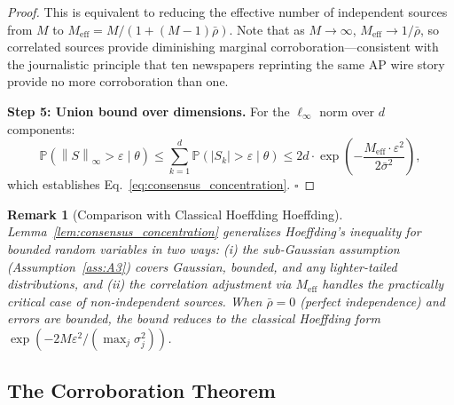 \documentclass[11pt,a4paper]{article}
\newtheorem{remark}[theorem]{Remark}
\theoremstyle{definition}
\newcommand{\Pbb}{\mathbb{P}}
\newcommand{\norm}[1]{\left\lVert#1\right\rVert}
\newcommand{\abs}[1]{\left|#1\right|}
\begin{document}
\begin{proof}
This is equivalent to reducing the effective number of independent sources from $M$ to $M_{\mathrm{eff}} = M / (1 + (M-1)\bar{\rho})$. Note that as $M \to \infty$, $M_{\mathrm{eff}} \to 1/\bar{\rho}$, so correlated sources provide diminishing marginal corroboration---consistent with the journalistic principle that ten newspapers reprinting the same AP wire story provide no more corroboration than one.

\textbf{Step 5: Union bound over dimensions.} For the $\ell_\infty$ norm over $d$ components:
\begin{equation}
    \Pbb(\norm{S}_\infty > \varepsilon \mid \theta) \leq \sum_{k=1}^{d} \Pbb(\abs{S_k} > \varepsilon \mid \theta) \leq 2d \cdot \exp\left(-\frac{M_{\mathrm{eff}} \cdot \varepsilon^2}{2\bar{\sigma}^2}\right),
    \label{eq:union_bound}
\end{equation}
which establishes Eq.~\eqref{eq:consensus_concentration}. $\square$
\end{proof}

\begin{remark}[Comparison with Classical Hoeffding Hoeffding]
Lemma~\ref{lem:consensus_concentration} generalizes Hoeffding's inequality for bounded random variables in two ways: (i) the sub-Gaussian assumption (Assumption~\ref{ass:A3}) covers Gaussian, bounded, and any lighter-tailed distributions, and (ii) the correlation adjustment via $M_{\mathrm{eff}}$ handles the practically critical case of non-independent sources. When $\bar{\rho} = 0$ (perfect independence) and errors are bounded, the bound reduces to the classical Hoeffding form $\exp(-2M\varepsilon^2 / (\max_j \sigma_j^2))$.
\end{remark}

\subsection{The Corroboration Theorem}
\end{document}
